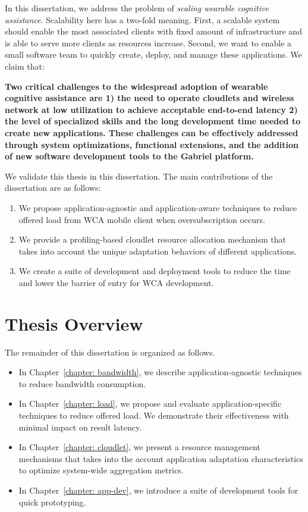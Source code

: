 In this dissertation, we address the problem of \textit{scaling wearable cognitive assistance}.
Scalability here has a two-fold meaning. First, a scalable system should enable
the most associated clients with fixed amount of infrastructure and is able to
serve more clients as resources increase. Second, we want to enable a small
software team to quickly create, deploy, and manage these applications. 
We claim that:

\textbf{Two critical challenges to the widespread adoption of wearable cognitive
  assistance are 1) the need to operate cloudlets and wireless network at low
  utilization to achieve acceptable end-to-end latency 2) the level of specialized
  skills and the long development time needed to create new applications. These
  challenges can be effectively addressed through system optimizations,
  functional extensions, and the addition of new software development tools to
  the Gabriel platform.}


We validate this thesis in this dissertation. The main contributions of the
dissertation are as follows:
\begin{enumerate}
  \item{We propose application-agnostic and application-aware techniques 
  to reduce offered load from WCA mobile client when oversubscription occurs.}
  \item{We provide a profiling-based cloudlet resource allocation mechanism that
  takes into account the unique adaptation behaviors of different applications.}
  \item{We create a suite of development and deployment tools to reduce the time
  and lower the barrier of entry for WCA development.}
\end{enumerate}

\section{Thesis Overview}

The remainder of this dissertation is organized as follows.

\begin{itemize}
  \item{In Chapter~\ref{chapter: bandwidth}, we describe application-agnostic techniques to reduce bandwidth consumption.}
  \item{In Chapter~\ref{chapter: load}, we propose and evaluate 
  application-specific techniques to reduce offered load. 
  We demonstrate their effectiveness 
  with minimal impact on result latency.}
  \item{In Chapter~\ref{chapter: cloudlet}, we present a resource management
  mechanisms that takes into the account application adaptation characteristics
  to optimize system-wide aggregation metrics.}
  \item{In Chapter~\ref{chapter: app-dev}, 
  we introduce a suite of development tools for quick prototyping.
  }
\end{itemize}